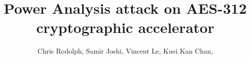 \documentclass[sigplan,screen,10pt]{acmart}
\begin{document}
\title{Power Analysis attack on AES-312 cryptographic accelerator}

\author{Chris Rodolph, Samir Joshi, Vincent Le, Kuei Kan Chan,}



\maketitle





% 

% 



\end{document}
